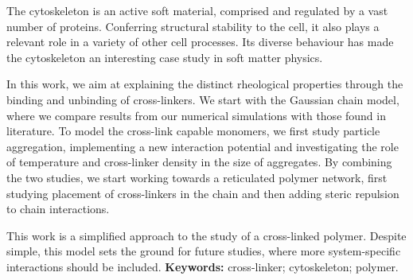 \documentclass[../../main.tex]{subfiles}
\begin{document}
%
    The cytoskeleton is an active soft material, comprised and regulated by a vast number of proteins. Conferring structural stability to the cell, it also plays a relevant role in a variety of other cell processes. Its diverse behaviour has made the cytoskeleton an interesting case study in soft matter physics. 
    
    In this work, we aim at explaining the distinct rheological properties through the binding and unbinding of cross-linkers. We start with the Gaussian chain model, where we compare results from our numerical simulations with those found in literature. To model the cross-link capable monomers, we first study particle aggregation, implementing a new interaction potential and investigating the role of temperature and cross-linker density in the size of aggregates. By combining the two studies, we start working towards a reticulated polymer network, first studying placement of cross-linkers in the chain and then adding steric repulsion to chain interactions.
    
    This work is a simplified approach to the study of a cross-linked polymer. Despite simple, this model sets the ground for future studies, where more system-specific interactions should be included. 
    \newline
    \newline
    \textbf{Keywords:} cross-linker; cytoskeleton; polymer.
%
\end{document}
